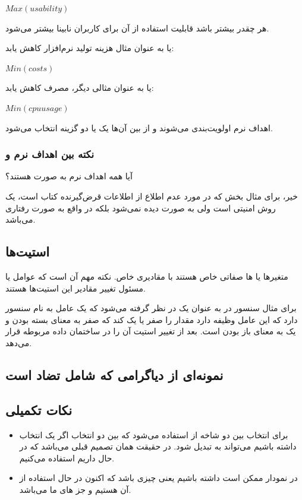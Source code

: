 $Max(usability)$

هر چقدر بیشتر باشد قابلیت استفاده از آن برای کاربران نابینا بیشتر می‌شود.

یا به عنوان مثال هزینه تولید نرم‌افزار کاهش یابد:

$Min(costs)$

یا به عنوان مثالی دیگر، مصرف  کاهش یابد:

$Min(cpu usage)$

اهداف نرم اولویت‌بندی می‌شوند و از بین آن‌ها یک یا دو گزینه انتخاب می‌شود.

\subsubsection{نکته بین اهداف نرم و }

آیا همه اهداف نرم به صورت  هستند؟

خیر، برای مثال بخش  که در مورد عدم اطلاع از اطلاعات قرض‌گیرنده کتاب
است، یک روش امنیتی است ولی به صورت  دیده نمی‌شود بلکه در واقع به صورت
رفتاری می‌باشد.

\subsection{استیت‌ها}

متغیر‌ها یا ها صفاتی خاص هستند با مقادیری خاص. نکته مهم آن است که
عوامل یا  مسئول تغییر مقادیر این استیت‌ها هستند.

برای مثال سنسور در به عنوان یک  در نظر گرفته می‌شود که یک عامل به
نام سنسور دارد که این عامل وظیفه دارد مقدار  را صفر یا یک کند که
صفر به معنای بسته بودن و یک به معنای باز بودن است. بعد از تغییر استیت آن را در
ساختمان داده مربوطه قرار می‌دهد.

\subsection{نمونه‌ای از دیاگرامی که شامل تضاد است}


\subsection{نکات تکمیلی}

\begin{itemize}
    \item برای انتخاب بین دو شاخه از  استفاده می‌شود که بین دو انتخاب
    اگر یک انتخاب داشته باشیم می‌تواند به  تبدیل شود. در حقیقت
    همان تصمیم قبلی می‌باشد که در حال داریم استفاده می‌کنیم.
    \item در نمودار ممکن است  داشته باشیم یعنی چیزی باشد که
    اکنون در حال استفاده از آن هستیم و جز های ما می‌باشد.
\end{itemize}

